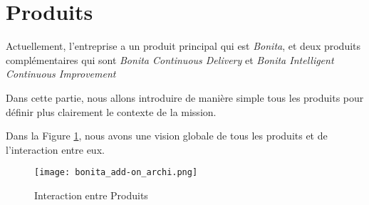 \section{Produits} \label{produits}
Actuellement, l'entreprise a un produit principal qui est \emph{Bonita}, et deux produits complémentaires qui sont \textit{Bonita Continuous Delivery} et \textit{Bonita Intelligent Continuous Improvement}

Dans cette partie, nous allons introduire de manière simple tous les produits pour définir plus clairement le contexte de la mission.

Dans la Figure \ref{fig:bonita_add-on}, nous avons une vision globale de tous les produits et de l'interaction entre eux.


\begin{figure}[!ht]
\advance\leftskip-2cm
\texttt{[image: bonita\_add-on\_archi.png]}
\caption{Interaction entre Produits}
\label{fig:bonita_add-on}
\end{figure}




